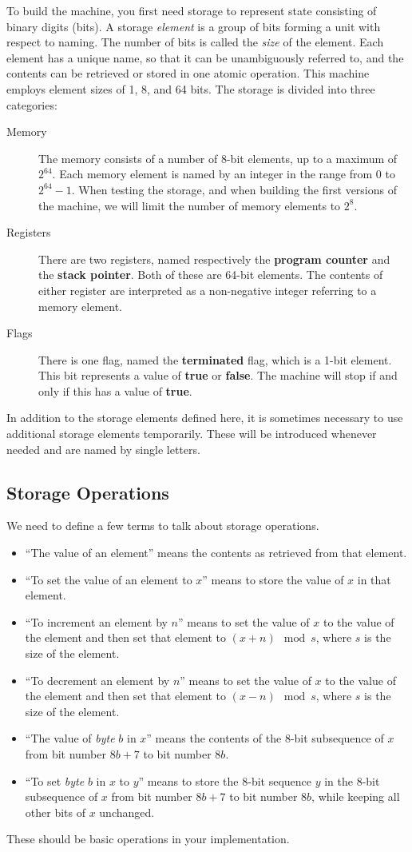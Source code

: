 \documentclass[a4paper,11pt]{article}
\newcommand{\PC}{\textbf{program counter}\xspace}
\newcommand{\SP}{\textbf{stack pointer}\xspace}
\newcommand{\TERM}{\textbf{terminated}\xspace}
\newcommand{\F}{\textbf{false}\xspace}
\newcommand{\T}{\textbf{true}\xspace}
\begin{document}
To build the machine, you first need storage to represent state consisting of binary digits (bits).
A storage \emph{element} is a group of bits forming a unit with respect to naming.
The number of bits is called the \emph{size} of the element.
Each element has a unique name, so that it can be unambiguously referred to, and the contents can be retrieved or stored in one atomic operation.
This machine employs element sizes of 1, 8, and 64 bits.
The storage is divided into three categories:
\begin{description}
\item[Memory] 
The memory consists of a number of 8-bit elements, up to a maximum of $2^{64}$.
Each memory element is named by an integer in the range from $0$ to $2^{64} - 1$.
When testing the storage, and when building the first versions of the machine, we will limit the number of memory elements to $2^8$.
\item[Registers] 
There are two registers, named respectively the \PC and the \SP.
Both of these are 64-bit elements.
The contents of either register are interpreted as a non-negative integer referring to a memory element.
\item[Flags] 
There is one flag, named the \TERM flag, which is a 1-bit element.
This bit represents a value of \T or \F.
The machine will stop if and only if this has a value of \T.
\end{description}
In addition to the storage elements defined here, it is sometimes necessary to use additional storage elements temporarily.
These will be introduced whenever needed and are named by single letters.

\subsection{Storage Operations}
\label{sec:storage-operations}

We need to define a few terms to talk about storage operations.
\begin{itemize}
\item ``The value of an element'' means the contents as retrieved from that element.
\item ``To set the value of an element to $x$'' means to store the value of $x$ in that element.
\item ``To increment an element by $n$'' means to set the value of $x$ to the value of the element and then set that element to $(x + n) \mod s$, where $s$ is the size of the element.
\item ``To decrement an element by $n$'' means to set the value of $x$ to the value of the element and then set that element to $(x - n) \mod s$, where $s$ is the size of the element.
\item ``The value of \emph{byte} $b$ in $x$'' means the contents of the 8-bit subsequence of $x$ from bit number $8b+7$ to bit number $8b$.
\item ``To set \emph{byte} $b$ in $x$ to $y$'' means to store the 8-bit sequence $y$ in the 8-bit subsequence of $x$ from bit number $8b+7$ to bit number $8b$, while keeping all other bits of $x$ unchanged.
\end{itemize}
These should be basic operations in your implementation.
\end{document}
